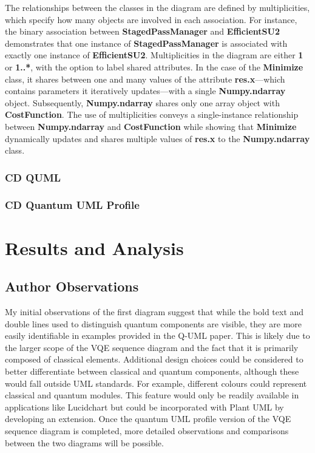 \documentclass{article}
\begin{document}
{The relationships between the classes in the diagram are defined by multiplicities, which specify how many objects are involved in each association. For instance, the binary association between \textbf{StagedPassManager} and \textbf{EfficientSU2} demonstrates that one instance of \textbf{StagedPassManager} is associated with exactly one instance of \textbf{EfficientSU2}. Multiplicities in the diagram are either \textbf{1} or \textbf{1..*}, with the option to label shared attributes. In the case of the \textbf{Minimize} class, it shares between one and many values of the attribute \textbf{res.x}—which contains parameters it iteratively updates—with a single \textbf{Numpy.ndarray} object. Subsequently, \textbf{Numpy.ndarray} shares only one array object with \textbf{CostFunction}. The use of multiplicities conveys a single-instance relationship between \textbf{Numpy.ndarray} and \textbf{CostFunction} while showing that \textbf{Minimize} dynamically updates and shares multiple values of \textbf{res.x} to the \textbf{Numpy.ndarray} class.

\subsubsection{CD QUML}

\subsubsection{CD Quantum UML Profile}

\section{Results and Analysis}

\subsection{Author Observations}

My initial observations of the first diagram suggest that while the bold text and double lines used to distinguish quantum components are visible, they are more easily identifiable in examples provided in the Q-UML paper. This is likely due to the larger scope of the VQE sequence diagram and the fact that it is primarily composed of classical elements.
Additional design choices could be considered to better differentiate between classical and quantum components, although these would fall outside UML standards. For example, different colours could represent classical and quantum modules. This feature would only be readily available in applications like Lucidchart but could be incorporated with Plant UML by developing an extension.
Once the quantum UML profile version of the VQE sequence diagram is completed, more detailed observations and comparisons between the two diagrams will be possible.

}
\end{document}
